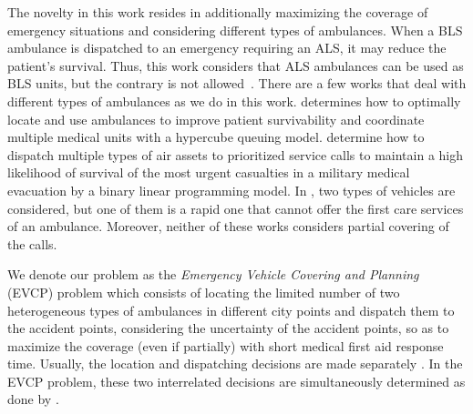 



The novelty in this work resides in additionally maximizing the coverage of emergency situations and considering different types of ambulances. When a BLS ambulance is dispatched to an emergency requiring an ALS, it may reduce the patient's survival. Thus, this work considers that ALS ambulances can be used as BLS units, but the contrary is not allowed~\citep{bakalos2011advanced}. There are a few works that deal with different types of ambulances as we do in this work. \citet{mclay2009maximum} determines how to optimally locate and use ambulances to improve patient survivability and coordinate multiple medical units with a hypercube queuing model. \citet{grannan2015maximum} determine how to dispatch multiple types of air assets to prioritized service calls to maintain a high likelihood of survival of the most urgent casualties in a military medical evacuation by a binary linear programming model. In \citet{yoon2021stochastic}, two types of vehicles are considered, but one of them is a rapid one that cannot offer the first care services of an ambulance. Moreover, neither of these works considers partial covering of the calls. 

We denote our problem as the \textit{Emergency Vehicle Covering and Planning} (EVCP) problem which consists of locating the limited number of two heterogeneous types of ambulances in different city points and dispatch them to the accident points, considering the uncertainty of the accident points, so as to maximize the coverage (even if partially) with short medical first aid response time. Usually, the location and dispatching decisions are made separately \citep{belanger2019recent, dibene2017optimizing, wang2012modeling}. In the EVCP problem, these two interrelated decisions are simultaneously determined as done by \citet{toro2015reducing, ansari2017maximum, amorim2019traffic}. 

